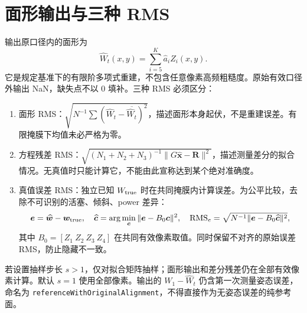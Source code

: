 \documentclass[UTF8,a4paper,zihao=-4]{ctexart}
\newcommand{\RMS}{\operatorname{RMS}}
\begin{document}
\section{面形输出与三种 RMS}
输出原口径内的面形为
\begin{equation}
\widehat W_t(x,y)=\sum_{i=5}^K\widehat a_iZ_i(x,y).
\end{equation}
它是规定基准下的有限阶多项式重建，不包含任意像素高频粗糙度。原始有效口径外输出 NaN，缺失点不以 0 填补。三种 RMS 必须区分：
\begin{enumerate}
\item 面形 RMS：$\sqrt{N^{-1}\sum(\widehat W_t-\overline{\widehat W_t})^2}$，描述面形本身起伏，不是重建误差。有限掩膜下均值未必严格为零。
\item 方程残差 RMS：$\sqrt{(N_1+N_2+N_3)^{-1}\|G\widehat{\bm x}-\bm R\|^2}$，描述测量差分的拟合情况。无真值时只能计算它，不能由此宣称达到某个绝对准确度。
\item 真值误差 RMS：独立已知 $W_{\rm true}$ 时在共同掩膜内计算误差。为公平比较，去除不可识别的活塞、倾斜、power 差异：
\begin{equation}
\bm e=\widehat{\bm w}-\bm w_{\rm true},\quad
\widehat{\bm c}=\arg\min_{\bm c}\|\bm e-B_0\bm c\|^2,\quad
\RMS_e=\sqrt{N^{-1}\|\bm e-B_0\widehat{\bm c}\|^2},
\end{equation}
其中 $B_0=[Z_1\ Z_2\ Z_3\ Z_4]$ 在共同有效像素取值。同时保留不对齐的原始误差 RMS，防止隐藏不一致。
\end{enumerate}
若设置抽样步长 $s>1$，仅对拟合矩阵抽样；面形输出和差分残差仍在全部有效像素计算。默认 $s=1$ 使用全部像素。输出的 $W_1-\widehat W_t$ 仍含第一次测量姿态误差，命名为 \texttt{referenceWithOriginalAlignment}，不得直接作为无姿态误差的纯参考面。
\end{document}
